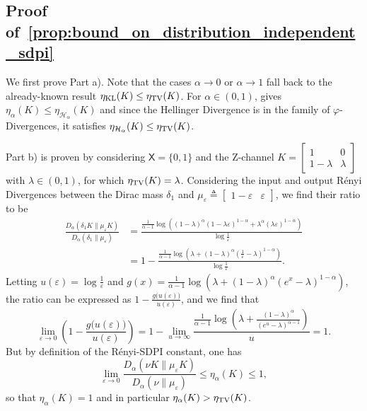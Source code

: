 \documentclass[conference,letterpaper]{IEEEtran}
\def \X{\mathsf X}
\def \calH{\mathcal H}
\newcommand{\renyiDiv}[2]{D_{\alpha}\left(#1\|#2\right)}
\begin{document}
\subsection{Proof of~\cref{prop:bound_on_distribution_independent_sdpi}}\label{appendix:proof_bound_on_distribution_independent_sdpi}\noindent
    We first prove Part a). Note that the cases $\alpha\to0$ or $\alpha\to1$ fall back to the already-known result $\eta_{\rm KL}(K)\leq\eta_{\rm TV}(K)$. For $\alpha\in(0,1)$,  gives $\eta_\alpha(K)\leq\eta_{\calH_\alpha}(K)$ and since the Hellinger Divergence is in the family of $\varphi$-Divergences, it satisfies $\eta_{\calH_\alpha}(K)\leq\eta_{\rm TV}(K)$.
    
    Part b) is proven by considering $\X=\{0,1\}$ and the Z-channel $K = \begin{bmatrix}
        1 & 0\\
        1-\lambda & \lambda
    \end{bmatrix}$ with $\lambda\in(0, 1)$, for which $\eta_{\rm TV}(K)=\lambda$. Considering the input and output R\'enyi Divergences between the Dirac mass $\delta_1$ and $\mu_\varepsilon \triangleq \begin{bmatrix}
        1-\varepsilon&\varepsilon
    \end{bmatrix}$, we find their ratio to be
    \begin{align*}
        \frac{\renyiDiv{\delta_1 K}{\mu_\varepsilon K}}{\renyiDiv{\delta_1}{\mu_\varepsilon}} &= \frac{\frac1{\alpha-1}\log\left((1-\lambda)^\alpha(1-\lambda\varepsilon)^{1-\alpha} + \lambda^\alpha(\lambda\varepsilon)^{1-\alpha}\right)}{\log \frac1\varepsilon} \\
        &= 1 - \frac{\frac1{\alpha-1}\log\left(\lambda + (1-\lambda)^\alpha(\frac1\varepsilon-\lambda )^{1-\alpha}\right)}{\log\frac1\varepsilon}.
    \end{align*}
    Letting $u(\varepsilon) = \log\frac1\varepsilon$ and $g(x) = \frac1{\alpha-1}\log\left(\lambda + (1-\lambda)^\alpha(e^x-\lambda )^{1-\alpha}\right)$, the ratio can be expressed as $1 - \frac{g\big(u(\varepsilon)\big)}{u(\varepsilon)}$, and we find that
    \begin{equation*}
        \lim_{\varepsilon\to0}\left(1-\frac{g\big(u(\varepsilon)\big)}{u(\varepsilon)}\right) = 1 - \lim_{u\to\infty}\frac{\frac1{\alpha-1}\log\left(\lambda + \frac{(1-\lambda)^\alpha}{(e^u-\lambda )^{\alpha-1}}\right)}{u} = 1.
    \end{equation*}
    But by definition of the R\'enyi-SDPI constant, one has
    \begin{equation*}
        \lim_{\varepsilon\to0}\frac{\renyiDiv{\nu K}{\mu_\varepsilon K}}{\renyiDiv{\nu}{\mu_\varepsilon}} \leq \eta_\alpha(K)\leq 1,
    \end{equation*}
    so that $\eta_\alpha(K) = 1$ and in particular $\eta_\alpha(K) > \eta_{\rm TV}(K)$.
    
\end{document}
